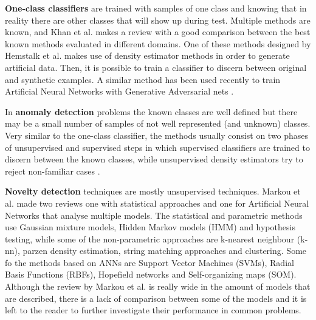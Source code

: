 \documentclass[a4paper, 12pt]{article}
\begin{document}
\textbf{One-class classifiers} are trained with samples of one class and knowing that in reality there are other classes that will show up during test. Multiple methods are known, and Khan et al. makes a review \cite{Khan2014} with a good comparison between the best known methods evaluated in different domains.
One of these methods designed by Hemstalk et al. \cite{Hempstalk2008} makes use of density estimator methods in order to generate artificial data. Then, it is possible to train a classifier to discern between original and synthetic examples.
A similar method has been used recently to train Artificial Neural Networks with Generative Adversarial nets \cite{Goodfellow2014,Goodfellow2014a}.

In \textbf{anomaly detection} problems the known classes are well defined but there may be a small number of samples of not well represented (and unknown) classes.
Very similar to the one-class classifier, the methods usually consist on two phases of unsupervised and supervised steps in which supervised classifiers are trained to discern between the known classes, while unsupervised density estimators try to reject non-familiar cases \cite{Landgrebe2006,Landgrebe}.



\textbf{Novelty detection} techniques are mostly unsupervised techniques. Markou et al. made two reviews one with statistical approaches \cite{Markou2003} and one for Artificial Neural Networks \cite{Markou2003a} that analyse multiple models.
The statistical and parametric methods use Gaussian mixture models, Hidden Markov models (HMM) and hypothesis testing, while some of the non-parametric approaches are k-nearest neighbour (k-nn), parzen density estimation, string matching approaches and clustering.
Some fo the methods based on ANNs are Support Vector Machines (SVMs), Radial Basis Functions (RBFs), Hopefield networks and Self-organizing maps (SOM).
Although the review by Markou et al. is really wide in the amount of models that are described, there is a lack of comparison between some of the models and it is left to the reader to further investigate their performance in common problems.
\end{document}
